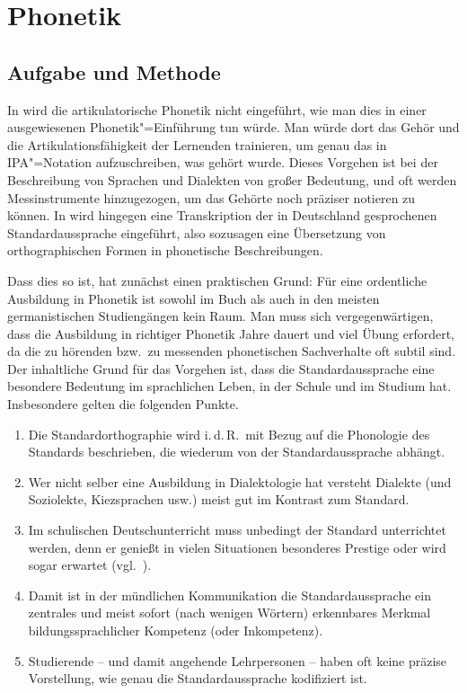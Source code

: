 \chapter{Phonetik}
\label{sec:phonetik}

\section{Aufgabe und Methode}
\label{sec:phonetik:aufgabeundmethoden}

In \EGBD wird die artikulatorische Phonetik nicht eingeführt, wie man dies in einer ausgewiesenen Phonetik"=Einführung tun würde.
Man würde dort das Gehör und die Artikulationsfähigkeit der Lernenden trainieren, um genau das in IPA"=Notation aufzuschreiben, was gehört wurde.
Dieses Vorgehen ist bei der Beschreibung von Sprachen und Dialekten von großer Bedeutung, und oft werden Messinstrumente hinzugezogen, um das Gehörte noch präziser notieren zu können.
In \EGBD wird hingegen eine Transkription der in Deutschland gesprochenen Standardaussprache eingeführt, also sozusagen eine Übersetzung von orthographischen Formen in phonetische Beschreibungen.

Dass dies so ist, hat zunächst einen praktischen Grund:
Für eine ordentliche Ausbildung in Phonetik ist sowohl im Buch als auch in den meisten germanistischen Studiengängen kein Raum.
Man muss sich vergegenwärtigen, dass die Ausbildung in richtiger Phonetik Jahre dauert und viel Übung erfordert, da die zu hörenden bzw.\ zu messenden phonetischen Sachverhalte oft subtil sind.
Der inhaltliche Grund für das Vorgehen ist, dass die Standardaussprache eine besondere Bedeutung im sprachlichen Leben, in der Schule und im Studium hat.
Insbesondere gelten die folgenden Punkte.

\begin{enumerate}
  \item Die Standardorthographie wird i.\,d.\,R.\ mit Bezug auf die Phonologie des Standards beschrieben, die wiederum von der Standardaussprache abhängt.
  \item Wer nicht selber eine Ausbildung in Dialektologie hat versteht Dialekte (und Soziolekte, Kiezsprachen usw.) meist gut im Kontrast zum Standard.
  \item Im schulischen Deutschunterricht muss unbedingt der Standard unterrichtet werden, denn er genießt in vielen Situationen besonderes Prestige oder wird sogar erwartet (vgl.\ \citealt[7]{KrechEa2009}).
  \item Damit ist in der mündlichen Kommunikation die Standardaussprache ein zentrales und meist sofort (nach wenigen Wörtern) erkennbares Merkmal bildungssprachlicher Kompetenz (oder Inkompetenz).
  \item Studierende -- und damit angehende Lehrpersonen -- haben oft keine präzise Vorstellung, wie genau die Standardaussprache kodifiziert ist.
\end{enumerate}

